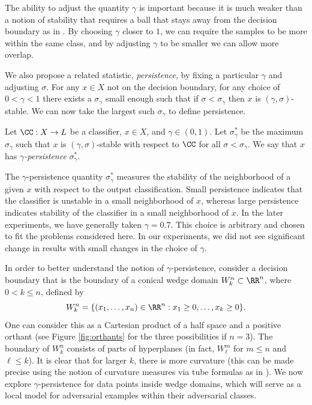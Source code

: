 The ability to adjust the quantity $\gamma$ is important because it is much weaker than a notion of stability that requires a ball that stays away from the decision boundary as in \cite{Khoury2018}. By choosing $\gamma$ closer to $1$, we can require the samples to be more within the same class, and by adjusting $\gamma$ to be smaller we can allow more overlap.

We also propose a related statistic, \emph{persistence}, by fixing a particular $\gamma$ and adjusting $\sigma$. For any $x\in X$ not on the decision boundary, for any choice of $0<\gamma<1$ there exists a $\sigma_\gamma$ small enough such that if $\sigma < \sigma_\gamma$ then $x$ is $(\gamma,\sigma)$-stable. We can now take the largest such $\sigma_\gamma$ to define persistence.



\begin{definition}
    Let $\CC:X\to L$ be a classifier, $x \in X$, and $\gamma\in(0,1)$. Let $\sigma_\gamma^*$ be the maximum $\sigma_\gamma$ such that $x$ is $(\gamma, \sigma)$-stable with respect to $\CC$ for all $\sigma<\sigma_\gamma$. We say that $x$ has \emph{$\gamma$-persistence} $\sigma_\gamma^*$.
\end{definition}

The $\gamma$-persistence quantity $\sigma_\gamma^*$ measures the stability of the neighborhood of a given $x$ with respect to the output classification. Small persistence indicates that the classifier is unstable in a small neighborhood of $x$, whereas large persistence indicates stability of the classifier in a small neighborhood of $x$. In the later experiments, we have generally taken $\gamma = 0.7$. This choice is arbitrary and chosen to fit the problems considered here. In our experiments, we did not see significant change in results with small changes in the choice of $\gamma$.

In order to better understand the notion of $\gamma$-persistence, consider a decision boundary that is the boundary of a conical wedge domain $W^n_k \subset \RR^n$, where $0<k\leq n$, defined by 
\[
    W^n_k = \{(x_1, \ldots, x_n) \in \RR^n : x_1 \geq 0, \ldots, x_k \geq 0\}.
\]
One can consider this as a Cartesian product of a half space and a positive orthant (see Figure \ref{fig:orthants} for the three possibilities if $n=3$). The boundary of $W^n_k$ consists of parts of hyperplanes (in fact, $W^m_\ell$ for $m\leq n$ and $\ell \leq k$). It is clear that for larger $k$, there is more curvature (this can be made precise using the notion of curvature measures via tube formulas as in \cite{morvan}). We now explore $\gamma$-persistence for data points inside wedge domains, which will serve as a local model for adversarial examples within their adversarial classes.

